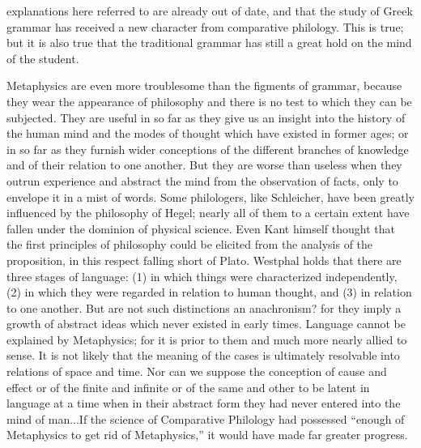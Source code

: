 \documentclass[11pt,letter]{article}
\begin{document}
explanations here referred to are already out of date, and that the study of Greek grammar has received a new character from comparative philology. This is true; but it is also true that the traditional grammar has still a great hold on the mind of the student.

\par  Metaphysics are even more troublesome than the figments of grammar, because they wear the appearance of philosophy and there is no test to which they can be subjected. They are useful in so far as they give us an insight into the history of the human mind and the modes of thought which have existed in former ages; or in so far as they furnish wider conceptions of the different branches of knowledge and of their relation to one another. But they are worse than useless when they outrun experience and abstract the mind from the observation of facts, only to envelope it in a mist of words. Some philologers, like Schleicher, have been greatly influenced by the philosophy of Hegel; nearly all of them to a certain extent have fallen under the dominion of physical science. Even Kant himself thought that the first principles of philosophy could be elicited from the analysis of the proposition, in this respect falling short of Plato. Westphal holds that there are three stages of language: (1) in which things were characterized independently, (2) in which they were regarded in relation to human thought, and (3) in relation to one another. But are not such distinctions an anachronism? for they imply a growth of abstract ideas which never existed in early times. Language cannot be explained by Metaphysics; for it is prior to them and much more nearly allied to sense. It is not likely that the meaning of the cases is ultimately resolvable into relations of space and time. Nor can we suppose the conception of cause and effect or of the finite and infinite or of the same and other to be latent in language at a time when in their abstract form they had never entered into the mind of man...If the science of Comparative Philology had possessed “enough of Metaphysics to get rid of Metaphysics,” it would have made far greater progress.
\end{document}

